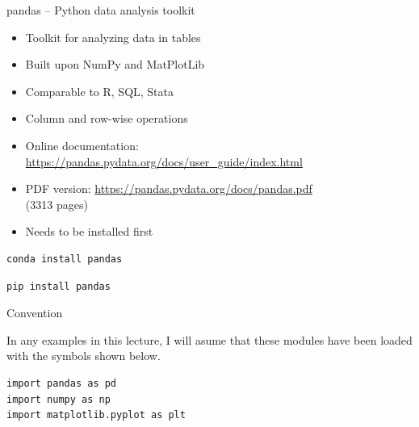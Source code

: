 \begin{frame}[fragile]{pandas -- Python data analysis toolkit}
%
\begin{itemize}
\item Toolkit for analyzing data in tables
\item Built upon NumPy and MatPlotLib
\item Comparable to R, SQL, Stata
\item Column and row-wise operations
\item Online documentation: \url{https://pandas.pydata.org/docs/user_guide/index.html}
\item PDF version: \url{https://pandas.pydata.org/docs/pandas.pdf} \\
	(3313 pages)
\item Needs to be installed first
\end{itemize}
%
\vspace{6pt}
\begin{tcbraster}[raster columns=2,
                  raster equal height,
                  nobeforeafter,
                  raster column skip=0.5cm]
\begin{cmdbox}
\begin{verbatim}
conda install pandas
\end{verbatim}
\end{cmdbox}
%
\begin{cmdbox}
\begin{verbatim}
pip install pandas
\end{verbatim}
\end{cmdbox}
\end{tcbraster}
%
\end{frame}


\begin{frame}[fragile]{Convention}
%
\begin{center}
In any examples in this lecture, I will asume that these modules have been loaded with the symbols shown below.
\end{center}
%
\begin{codebox}
\begin{verbatim}
import pandas as pd
import numpy as np
import matplotlib.pyplot as plt
\end{verbatim}
\end{codebox}
%
\end{frame}

